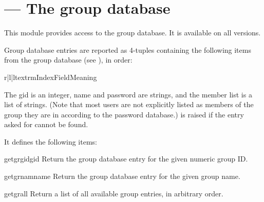 \section{ ---
         The group database}



This module provides access to the \UNIX{} group database.
It is available on all \UNIX{} versions.

Group database entries are reported as 4-tuples containing the
following items from the group database (see ), in order:

\begin{tableiii}{r|l|l}{textrm}{Index}{Field}{Meaning}
\end{tableiii}

The gid is an integer, name and password are strings, and the member
list is a list of strings.
(Note that most users are not explicitly listed as members of the
group they are in according to the password database.)
 is raised if the entry asked for cannot be found.

It defines the following items:

\begin{funcdesc}{getgrgid}{gid}
Return the group database entry for the given numeric group ID.
\end{funcdesc}

\begin{funcdesc}{getgrnam}{name}
Return the group database entry for the given group name.
\end{funcdesc}

\begin{funcdesc}{getgrall}{}
Return a list of all available group entries, in arbitrary order.
\end{funcdesc}


\begin{seealso}
\end{seealso}
